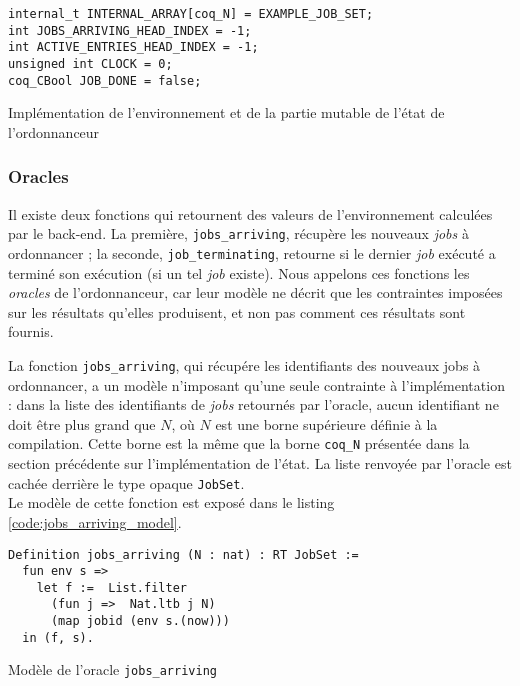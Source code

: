 	\begin{listing}[!ht]
	\begin{verbatim}
internal_t INTERNAL_ARRAY[coq_N] = EXAMPLE_JOB_SET;
int JOBS_ARRIVING_HEAD_INDEX = -1;
int ACTIVE_ENTRIES_HEAD_INDEX = -1;
unsigned int CLOCK = 0;
coq_CBool JOB_DONE = false;
	\end{verbatim}
	\caption{Implémentation de l'environnement et de la partie mutable de l'état de l'ordonnanceur}
	\label{code:sched_state_impl}
	\end{listing}

	\subsubsection{Oracles}

	Il existe deux fonctions qui retournent des valeurs de l'environnement calculées par le back-end. La première, \texttt{jobs\_arriving}, récupère les nouveaux \emph{jobs} à ordonnancer ; la seconde, \texttt{job\_terminating}, retourne si le dernier \emph{job} exécuté a terminé son exécution (si un tel \emph{job} existe). Nous appelons ces fonctions les \emph{oracles} de l'ordonnanceur, car leur modèle ne décrit que les contraintes imposées sur les résultats qu'elles produisent, et non pas comment ces résultats sont fournis.

	La fonction \texttt{jobs\_arriving}, qui récupére les identifiants des nouveaux jobs à ordonnancer, a un modèle n'imposant qu'une seule contrainte à l'implémentation : dans la liste des identifiants de \emph{jobs} retournés par l'oracle, aucun identifiant ne doit être plus grand que $N$, où $N$ est une borne supérieure définie à la compilation. Cette borne est la même que la borne \texttt{coq\_N} présentée dans la section précédente sur l'implémentation de l'état. La liste renvoyée par l'oracle est cachée derrière le type opaque \texttt{JobSet}.\\
	Le modèle de cette fonction est exposé dans le listing \ref{code:jobs_arriving_model}.

	\begin{listing}[!ht]
	\begin{verbatim}
Definition jobs_arriving (N : nat) : RT JobSet :=
  fun env s =>
    let f :=  List.filter
      (fun j =>  Nat.ltb j N)
      (map jobid (env s.(now))) 
  in (f, s).
	\end{verbatim}
	\caption{Modèle de l'oracle \texttt{jobs\_arriving}}
	\label{code:jobs_arriving_model}
	\end{listing}

